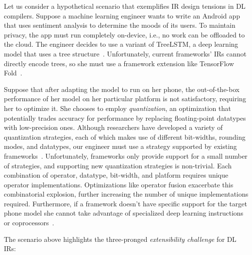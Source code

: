 Let us consider a hypothetical scenario that exemplifies
  IR design tensions in DL compilers.
Suppose a machine learning engineer wants to write
  an Android app that uses sentiment analysis to
  determine the moods of its users.
To maintain privacy, the app must run completely on-device,
  i.e., no work can be offloaded to the cloud.
The engineer decides to use a variant of TreeLSTM,
  a deep learning model that uses a tree structure~\citep{tree_lstm}.
Unfortunately, current frameworks' IRs cannot directly encode trees,
  so she must use a framework extension
  like TensorFlow Fold~\citep{tensorflowfold}.

Suppose that after adapting the model to run on her phone,
  the out-of-the-box performance of her
  model on her particular platform is not satisfactory, requiring her to optimize it.
She chooses to employ \textit{quantization}, an optimization that
  potentially trades accuracy for performance by replacing
  floating-point datatypes with low-precision ones.
Although researchers have developed a variety of quantization
  strategies, each of which makes use of different bit-widths, rounding
  modes, and datatypes, our engineer must use a strategy supported
  by existing frameworks~\citep{gustafson2015end, tf_lite_ops_compat, glow_quant}.
Unfortunately, frameworks only provide support for a small number
  of strategies, and supporting new quantization strategies is non-trivial.
Each combination of operator, datatype, bit-width, and
  platform requires unique operator implementations.
Optimizations like operator fusion exacerbate this combinatorial explosion,
  further increasing
  the number of unique implementations required.
Furthermore, if a framework doesn't have specific support for
  the target phone model she cannot take advantage of specialized deep learning
  instructions or coprocessors~\citep{apple_neural_engine}.

The scenario above highlights the three-pronged \textit{extensibility challenge}
  for DL IRs:

